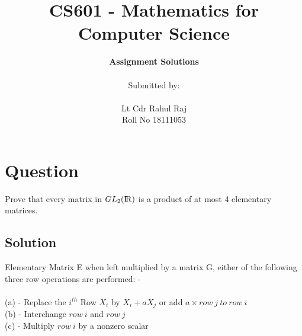 \documentclass[12pt]{article}
\newcommand\tab[1][1cm]{\hspace*{#1}}
\begin{document}
 
 
 
\title{CS601 - Mathematics for Computer Science }%
\author{\textbf{Assignment Solutions}\\ \\ Submitted by:\\ \\Lt Cdr Rahul Raj\\ Roll No 18111053\\ %
} %

\maketitle

\clearpage
\section{Question}
Prove that every matrix in $GL_2 ({\rm I\!R})$ is a product of at most 4 elementary matrices.
\subsection{Solution}
Elementary Matrix E when left multiplied by a matrix G,  either of the  following three row operations are performed: -\\ \\
\noindent
\tab (a) - Replace the $i^{th}$ Row $X_i$ by $X_i + aX_j$ or add $a \times row\ j\ to\ row\ i$\\
\noindent
\tab (b) - Interchange $row\ i$ and $row\ j$\\
\noindent
\tab (c) - Multiply $ row\ i$ by a nonzero scalar\\
\end{document}
